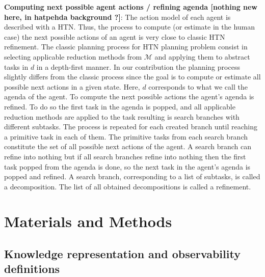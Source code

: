 \documentclass[letterpaper]{article} %
\begin{document}
\textbf{Computing next possible agent actions / refining agenda [nothing new here, in hatpehda background ?]}:
The action model of each agent is described with a HTN. Thus, the process to compute (or estimate in the human case) the next possible actions of an agent is very close to classic HTN refinement.
The classic planning process for HTN planning problem consist in selecting applicable reduction methods from $\mathcal{M}$ and applying them to abstract tasks in $d$ in a depth-first manner. In our contribution the planning process slightly differs from the classic process since the goal is to compute or estimate all possible next actions in a given state. 
Here, $d$ corresponds to what we call the agenda of the agent. To compute the next possible actions the agent's agenda is refined. To do so the first task in the agenda is popped, and all applicable reduction methods are applied to the task resulting is search branches with different subtasks. The process is repeated for each created branch until reaching a primitive task in each of them. The primitive tasks from each search branch constitute the set of all possible next actions of the agent.
A search branch can refine into nothing but if all search branches refine into nothing then the first task popped from the agenda is done, so the next task in the agent's agenda is popped and refined. 
A search branch, corresponding to a list of subtasks, is called a decomposition. The list of all obtained decompositions is called a refinement.  


\section{Materials and Methods}



\subsection{Knowledge representation and observability definitions}
\end{document}
